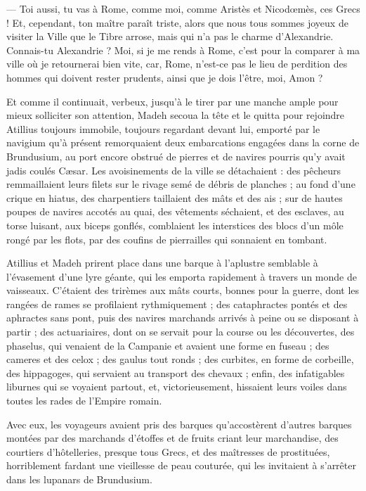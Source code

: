 \documentclass[a4paper, 11pt, oneside, polutonikogreek, french]{article}
\begin{document}
--- Toi aussi, tu vas à Rome, comme moi, comme Aristès et Nicodœmès, ces Grecs ! Et, cependant, ton maître paraît triste, alors que nous tous sommes joyeux de visiter la Ville que le Tibre arrose, mais qui n'a pas le charme d'Alexandrie. Connais-tu Alexandrie ? Moi, si je me rends à Rome, c'est pour la comparer à ma ville où je retournerai bien vite, car, Rome, n'est-ce pas le lieu de perdition des hommes qui doivent rester prudents, ainsi que je dois l'être, moi, Amon ?

Et comme il continuait, verbeux, jusqu'à le tirer par une manche ample pour mieux solliciter son attention, Madeh secoua la tête et le quitta pour rejoindre Atillius toujours immobile, toujours regardant devant lui, emporté par le navigium qu'à présent remorquaient deux embarcations engagées dans la corne de Brundusium, au port encore obstrué de pierres et de navires pourris qu'y avait jadis coulés Cæsar. Les avoisinements de la ville se détachaient : des pêcheurs remmaillaient leurs filets sur le rivage semé de débris de planches ; au fond d'une crique en hiatus, des charpentiers taillaient des mâts et des ais ; sur de hautes poupes de navires accotés au quai, des vêtements séchaient, et des esclaves, au torse luisant, aux biceps gonflés, comblaient les interstices des blocs d'un môle rongé par les flots, par des coufins de pierrailles qui sonnaient en tombant.

Atillius et Madeh prirent place dans une barque à l'aplustre semblable à l'évasement d'une lyre géante, qui les emporta rapidement à travers un monde de vaisseaux. C'étaient des trirèmes aux mâts courts, bonnes pour la guerre, dont les rangées de rames se profilaient rythmiquement ; des cataphractes pontés et des aphractes sans pont, puis des navires marchands arrivés à peine ou se disposant à partir ; des actuariaires, dont on se servait pour la course ou les découvertes, des phaselus, qui venaient de la Campanie et avaient une forme en fuseau ; des cameres et des celox ; des gaulus tout ronds ; des curbites, en forme de corbeille, des hippagoges, qui servaient au transport des chevaux ; enfin, des infatigables liburnes qui se voyaient partout, et, victorieusement, hissaient leurs voiles dans toutes les rades de l'Empire romain.

Avec eux, les voyageurs avaient pris des barques qu'accostèrent d'autres barques montées par des marchands d'étoffes et de fruits criant leur marchandise, des courtiers d'hôtelleries, presque tous Grecs, et des maîtresses de prostituées, horriblement fardant une vieillesse de peau couturée, qui les invitaient à s'arrêter dans les lupanars de Brundusium.
\end{document}
